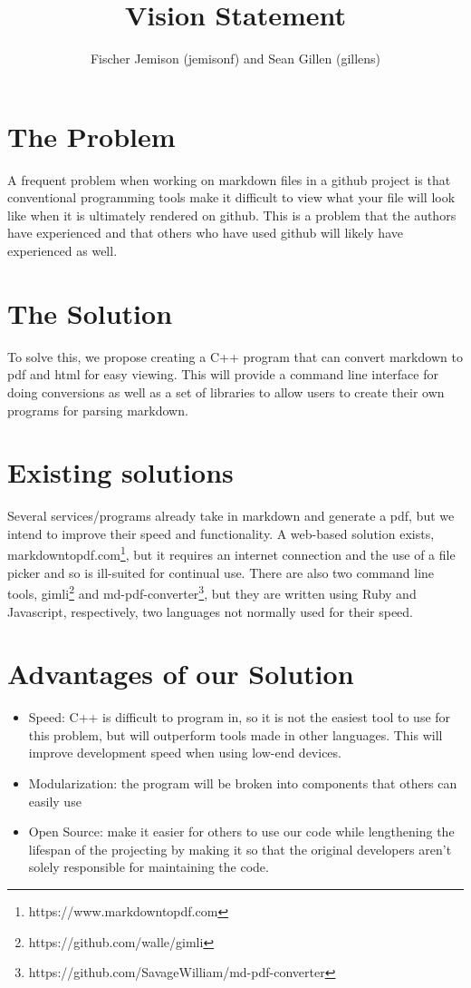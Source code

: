 \documentclass[12pt]{article}
\title{Vision Statement}
\author{Fischer Jemison (jemisonf) and Sean Gillen (gillens)}
\begin{document}
\maketitle
\tableofcontents


\section{The Problem}
A frequent problem when working on markdown files in a github project is that conventional programming tools make it difficult to view what your file will look like when it is ultimately rendered on github. This is a problem that the authors have experienced and that others who have used github will likely have experienced as well.
\section{The Solution}
To solve this, we propose creating a C++ program that can convert markdown to pdf and html for easy viewing. This will provide a command line interface for doing conversions as well as a set of libraries to allow users to create their own programs for parsing markdown.
\section{Existing solutions}
Several services/programs already take in markdown and generate a pdf, but we intend to improve their speed and functionality. A web-based solution exists, markdowntopdf.com\footnote{https://www.markdowntopdf.com}, but it requires an internet connection and the use of a file picker and so is ill-suited for continual use.
There are also two command line tools, gimli\footnote{https://github.com/walle/gimli} and md-pdf-converter\footnote{https://github.com/SavageWilliam/md-pdf-converter}, but they are written using Ruby and Javascript, respectively, two languages not normally used for their speed.
\section{Advantages of our Solution}
\begin{itemize}
	\item Speed: C++ is difficult to program in, so it is not the easiest tool to use for this problem, but will outperform tools made in other languages. This will improve development speed when using low-end devices.
	\item Modularization: the program will be broken into components that others can easily use
	\item Open Source: make it easier for others to use our code while lengthening the lifespan of the projecting by making it so that the original developers aren't solely responsible for maintaining the code.
\end{itemize}
\end{document}
